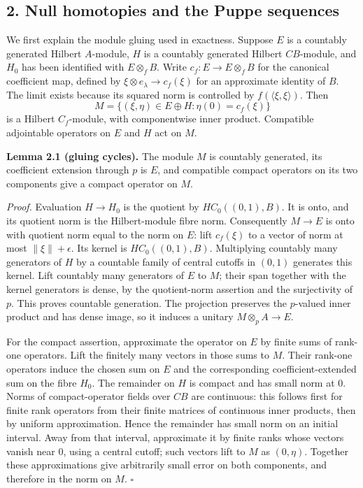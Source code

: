 \documentclass[
  11pt,
]{article}
\begin{document}
\subsection{2. Null homotopies and the Puppe
sequences}\label{null-homotopies-and-the-puppe-sequences}

We first explain the module gluing used in exactness. Suppose \(E\) is a
countably generated Hilbert \(A\)-module, \(H\) is a countably generated
Hilbert \(CB\)-module, and \(H_0\) has been identified with
\(E\otimes_f B\). Write \(c_f:E\to E\otimes_f B\) for the canonical
coefficient map, defined by \(\xi\otimes e_\lambda\to c_f(\xi)\) for an
approximate identity of \(B\). The limit exists because its squared norm
is controlled by \(f(\langle\xi,\xi\rangle)\). Then \[
M=\{(\xi,\eta)\in E\oplus H:\eta(0)=c_f(\xi)\}
\tag{2.1}
\] is a Hilbert \(C_f\)-module, with componentwise inner product.
Compatible adjointable operators on \(E\) and \(H\) act on \(M\).

\textbf{Lemma 2.1 (gluing cycles).} The module \(M\) is countably
generated, its coefficient extension through \(p\) is \(E\), and
compatible compact operators on its two components give a compact
operator on \(M\).

\emph{Proof.} Evaluation \(H\to H_0\) is the quotient by
\(H C_0((0,1),B)\). It is onto, and its quotient norm is the
Hilbert-module fibre norm. Consequently \(M\to E\) is onto with quotient
norm equal to the norm on \(E\): lift \(c_f(\xi)\) to a vector of norm
at most \(\|\xi\|+\epsilon\). Its kernel is \(H C_0((0,1),B)\).
Multiplying countably many generators of \(H\) by a countable family of
central cutoffs in \((0,1)\) generates this kernel. Lift countably many
generators of \(E\) to \(M\); their span together with the kernel
generators is dense, by the quotient-norm assertion and the surjectivity
of \(p\). This proves countable generation. The projection preserves the
\(p\)-valued inner product and has dense image, so it induces a unitary
\(M\otimes_p A\to E\).

For the compact assertion, approximate the operator on \(E\) by finite
sums of rank-one operators. Lift the finitely many vectors in those sums
to \(M\). Their rank-one operators induce the chosen sum on \(E\) and
the corresponding coefficient-extended sum on the fibre \(H_0\). The
remainder on \(H\) is compact and has small norm at 0. Norms of
compact-operator fields over \(CB\) are continuous: this follows first
for finite rank operators from their finite matrices of continuous inner
products, then by uniform approximation. Hence the remainder has small
norm on an initial interval. Away from that interval, approximate it by
finite ranks whose vectors vanish near 0, using a central cutoff; such
vectors lift to \(M\) as \((0,\eta)\). Together these approximations
give arbitrarily small error on both components, and therefore in the
norm on \(M\). \(\square\)
\end{document}
